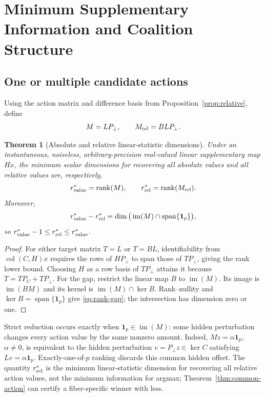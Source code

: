 \documentclass[10pt,twocolumn,twoside]{IEEEtran}
\newtheorem{theorem}{Theorem}
\DeclareMathOperator{\rank}{rank}
\DeclareMathOperator{\col}{col}
\begin{document}
\section{Minimum Supplementary Information and Coalition Structure}

\subsection{One or multiple candidate actions}

Using the action matrix and difference basis from
Proposition~\ref{prop:relative}, define
\begin{equation}
M=LP_\perp,\qquad M_{\rm rel}=BLP_\perp.
\label{eq:Lperp}
\end{equation}

\begin{theorem}[Absolute and relative linear-statistic dimensions]
\label{thm:min-stat}
Under an instantaneous, noiseless, arbitrary-precision real-valued linear
supplementary map \(Hx\), the minimum scalar dimensions for recovering all
absolute values and all relative values are, respectively,
\begin{equation}
r_{\rm value}^*=\rank(M),\qquad
r_{\rm rel}^*=\rank(M_{\rm rel}).
\label{eq:rstar}
\end{equation}
Moreover,
\begin{equation}
r_{\rm value}^*-r_{\rm rel}^*
=\dim\big(\operatorname{im}(M)\cap
\operatorname{span}\{\mathbf1_p\}\big),
\label{eq:rank-gap}
\end{equation}
so \(r_{\rm value}^*-1\le r_{\rm rel}^*\le r_{\rm value}^*\).
\end{theorem}

\begin{proof}
For either target matrix \(T=L\) or \(T=BL\), identifiability from
\(\col(C,H)x\) requires the rows of \(HP_\perp\) to span those of
\(TP_\perp\), giving the rank lower bound.  Choosing \(H\) as a row basis of
\(TP_\perp\) attains it because \(T=TP_C+TP_\perp\).
For the gap, restrict the linear map \(B\) to \(\operatorname{im}(M)\).
Its image is \(\operatorname{im}(BM)\) and its kernel is
\(\operatorname{im}(M)\cap\ker B\).  Rank--nullity and
\(\ker B=\operatorname{span}\{\mathbf1_p\}\) give
\eqref{eq:rank-gap}; the intersection has dimension zero or one.
\end{proof}

Strict reduction occurs exactly when
\(\mathbf1_p\in\operatorname{im}(M)\): some hidden perturbation changes every
action value by the same nonzero amount.  Indeed, \(Mz=\alpha\mathbf1_p\),
\(\alpha\ne0\), is equivalent to the hidden perturbation
\(v=P_\perp z\in\ker C\) satisfying \(Lv=\alpha\mathbf1_p\).
Exactly-one-of-\(p\) ranking discards
this common hidden offset.  The quantity \(r_{\rm rel}^*\) is the minimum
linear-statistic dimension for recovering all relative action values, not the
minimum information for argmax; Theorem~\ref{thm:common-action} can certify a
fiber-specific winner with less.
\end{document}
